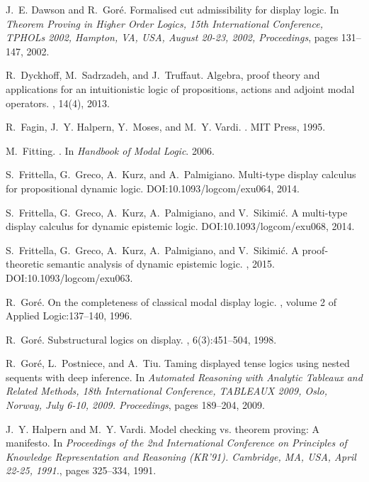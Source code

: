 \documentclass[runningheads,a4paper]{llncs}
\begin{document}
\begin{thebibliography}{10}
J.~E. Dawson and R.~Gor{\'{e}}.
\newblock Formalised cut admissibility for display logic.
\newblock In {\em Theorem Proving in Higher Order Logics, 15th International
  Conference, TPHOLs 2002, Hampton, VA, USA, August 20-23, 2002, Proceedings},
  pages 131--147, 2002.

R.~Dyckhoff, M.~Sadrzadeh, and J.~Truffaut.
\newblock Algebra, proof theory and applications for an intuitionistic logic of
  propositions, actions and adjoint modal operators.
, 14(4), 2013.

R.~Fagin, J.~Y. Halpern, Y.~Moses, and M.~Y. Vardi.
.
\newblock MIT Press, 1995.

M.~Fitting.
.
\newblock In {\em Handbook of Modal Logic}. 2006.

S.~Frittella, G.~Greco, A.~Kurz, and A.~Palmigiano.
\newblock Multi-type display calculus for propositional dynamic logic.
\newblock DOI:10.1093/logcom/exu064, 2014.

S.~Frittella, G.~Greco, A.~Kurz, A.~Palmigiano, and V.~Sikimi\'{c}.
\newblock A multi-type display calculus for dynamic epistemic logic.
\newblock DOI:10.1093/logcom/exu068, 2014.

S.~Frittella, G.~Greco, A.~Kurz, A.~Palmigiano, and V.~Sikimi\'{c}.
\newblock A proof-theoretic semantic analysis of dynamic epistemic logic.
, 2015.
\newblock DOI:10.1093/logcom/exu063.

R.~Gor{\'e}.
\newblock On the completeness of classical modal display logic.
, volume 2 of
  Applied Logic:137--140, 1996.

R.~Gor\'e.
\newblock Substructural logics on display.
, 6(3):451--504, 1998.

R.~Gor{\'{e}}, L.~Postniece, and A.~Tiu.
\newblock Taming displayed tense logics using nested sequents with deep
  inference.
\newblock In {\em Automated Reasoning with Analytic Tableaux and Related
  Methods, 18th International Conference, {TABLEAUX} 2009, Oslo, Norway, July
  6-10, 2009. Proceedings}, pages 189--204, 2009.

J.~Y. Halpern and M.~Y. Vardi.
\newblock Model checking vs. theorem proving: {A} manifesto.
\newblock In {\em Proceedings of the 2nd International Conference on Principles
  of Knowledge Representation and Reasoning (KR'91). Cambridge, MA, USA, April
  22-25, 1991.}, pages 325--334, 1991.


\end{thebibliography}
\end{document}
